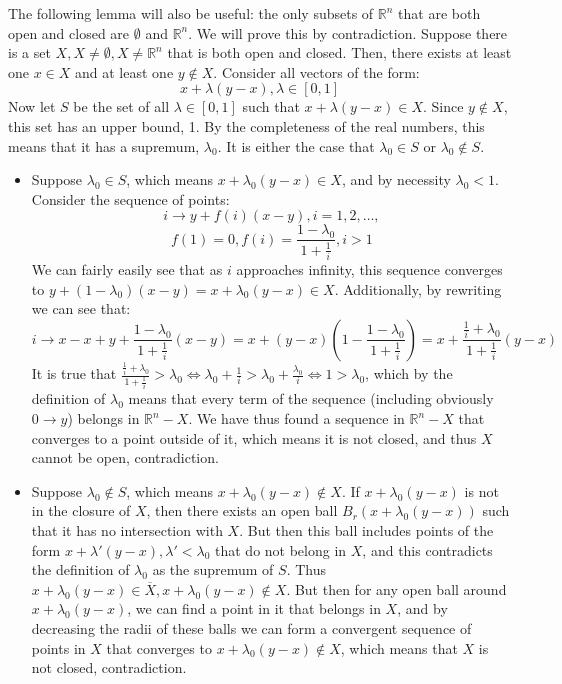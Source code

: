 \begin{solution}
    The following lemma will also be useful: the only subsets of $\mathbb{R}^n$ that are both open and closed are $\emptyset$ and $\mathbb{R}^n$. We will prove this by contradiction. Suppose there is a set $X, X \neq \emptyset, X \neq \mathbb{R}^n$ that is both open and closed. Then, there exists at least one $x \in X$ and at least one $y \notin X$. Consider all vectors of the form:
    $$x + \lambda(y - x), \lambda \in [0, 1]$$
    Now let $S$ be the set of all $\lambda \in [0, 1]$ such that $x + \lambda(y-x) \in X$. Since $y \notin X$, this set has an upper bound, 1. By the completeness of the real numbers, this means that it has a supremum, $\lambda_0$. It is either the case that $\lambda_0 \in S$ or $\lambda_0 \notin S$. 
    \begin{itemize}
        \item Suppose $\lambda_0 \in S$, which means $x + \lambda_0(y - x) \in X$, and by necessity $\lambda_0 < 1$. Consider the sequence of points:
        $$i \rightarrow y + f(i)(x - y), i =1, 2, \ldots, $$
        $$f(1) = 0, f(i) = \frac{1 - \lambda_0}{1 + \frac{1}{i}}, i >1$$
        We can fairly easily see that as $i$ approaches infinity, this sequence converges to $y + (1 - \lambda_0)(x - y) = x + \lambda_0(y - x) \in X$. Additionally, by rewriting we can see that:
        $$i \rightarrow x - x + y +\frac{1-\lambda_0}{1 + \frac{1}{i}}(x - y) = x + (y-x)(1-\frac{1-\lambda_0}{1 + \frac{1}{i}}) = x + \frac{\frac{1}{i} + \lambda_0}{1 + \frac{1}{i}}(y-x)$$
        It is true that $\frac{\frac{1}{i}+\lambda_0}{1+\frac{1}{i}} > \lambda_0 \iff \lambda_0+\frac{1}{i} > \lambda_0 + \frac{\lambda_0}{i} \iff 1 >\lambda_0$, which by the definition of $\lambda_0$ means that every term of the sequence (including obviously $0 \rightarrow y$) belongs in $\mathbb{R}^n-X$. We have thus found a sequence in $\mathbb{R}^n-X$ that converges to a point outside of it, which means it is not closed, and thus $X$ cannot be open, contradiction.
        \item Suppose $\lambda_0 \notin S$, which means $x + \lambda_0(y-x) \notin X$. If $x + \lambda_0(y-x)$ is not in the closure of $X$, then there exists an open ball $B_r(x + \lambda_0(y-x))$ such that it has no intersection with $X$. But then this ball includes points of the form $x+\lambda'(y-x), \lambda' < \lambda_0$ that do not belong in $X$, and this contradicts the definition of $\lambda_0$ as the supremum of $S$. Thus $x+\lambda_0(y-x) \in \overline{X}, x+\lambda_0(y-x) \notin X$. But then for any open ball around $x+\lambda_0(y-x)$, we can find a point in it that belongs in $X$, and by decreasing the radii of these balls we can form a convergent sequence of points in $X$ that converges to $x+\lambda_0(y-x) \notin X$, which means that $X$ is not closed, contradiction.
    \end{itemize}


\end{solution}
